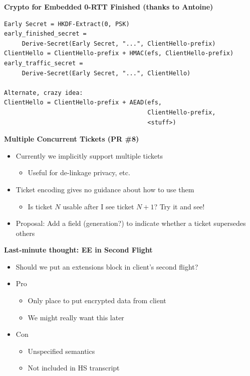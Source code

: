 \documentclass[helvetica]{seminar}
\newcommand{\heading}[1]{%
  \begin{center} 
    \large\bf 
    #1 
  \end{center} 
  \vspace{.4 in}}
\begin{document}
\begin{slide}
\heading{Crypto for Embedded 0-RTT Finished (thanks to Antoine)}

\begin{verbatim}
Early Secret = HKDF-Extract(0, PSK)
early_finished_secret =
     Derive-Secret(Early Secret, "...", ClientHello-prefix)
ClientHello = ClientHello-prefix + HMAC(efs, ClientHello-prefix)
early_traffic_secret =
     Derive-Secret(Early Secret, "...", ClientHello)

Alternate, crazy idea:
ClientHello = ClientHello-prefix + AEAD(efs,
                                        ClientHello-prefix,
                                        <stuff>)
\end{verbatim}
\end{slide}



\begin{slide}
\heading{Multiple Concurrent Tickets (PR \#8)}

\begin{itemize}
\item Currently we implicitly support multiple tickets
  \begin{itemize}
  \item Useful for de-linkage privacy, etc.
  \end{itemize}

\item Ticket encoding gives no guidance about how to use them
  \begin{itemize}
  \item Is ticket $N$ usable after I see ticket $N+1$? Try it and see!
  \end{itemize}

\item Proposal: Add a field (generation?) to indicate whether a ticket supersedes others
\end{itemize}

\end{slide}

\begin{slide}
\heading{Last-minute thought: EE in Second Flight}

\begin{itemize}
\item Should we put an extensions block in client's second flight?
\item Pro
  \begin{itemize}
  \item Only place to put encrypted data from client
  \item We might really want this later
  \end{itemize}

\item Con
  \begin{itemize}
  \item Unspecified semantics
  \item Not included in HS transcript
  \end{itemize}
\end{itemize}

\end{slide}
\end{document}
